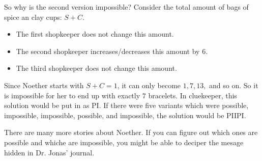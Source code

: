 So why is the second version impossible? Consider the total amount of bags of spice an clay cups: \(S + C\).
\begin{itemize}
  \item The first shopkeeper does not change this amount.
  \item The second shopkeeper increases/decreases this amount by 6.
  \item The third shopkeeper does not change this amount.
\end{itemize}
Since Noether starts with \(S + C = 1\), it can only become \(1, 7, 13,\) and so on.
So it is impossible for her to end up with exactly \(7\) bracelets.
In cluekeeper, this solution would be put in as PI.
If there were five variants which were possible, impossible, impossible, possible, and impossible, the solution would be PIIPI.

There are many more stories about Noether. If you can figure out which ones are possible and whiche are impossible, you might be able to deciper the mesage hidden in Dr. Jonas' journal.